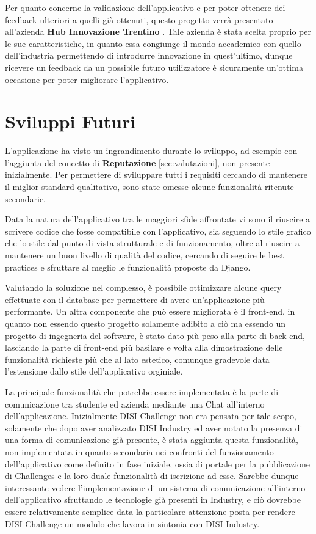 Per quanto concerne la validazione dell'applicativo e per poter ottenere dei feedback ulteriori a quelli già ottenuti, questo progetto verrà presentato all'azienda \textbf{Hub Innovazione Trentino} \cite{HiT}. Tale azienda è stata scelta proprio per le sue caratteristiche, in quanto essa congiunge il mondo accademico con quello dell'industria permettendo di introdurre innovazione in quest'ultimo, dunque ricevere un feedback da un possibile futuro utilizzatore è sicuramente un'ottima occasione per poter migliorare l'applicativo.


\section{Sviluppi Futuri}
L'applicazione ha visto un ingrandimento durante lo sviluppo, ad esempio con l'aggiunta del concetto di \textbf{Reputazione} \ref{sec:valutazioni}, non presente inizialmente. Per permettere di sviluppare tutti i requisiti cercando di mantenere il miglior standard qualitativo, sono state omesse alcune funzionalità ritenute secondarie.


Data la natura dell'applicativo tra le maggiori sfide affrontate vi sono il riuscire a scrivere codice che fosse compatibile con l'applicativo, sia seguendo lo stile grafico che lo stile dal punto di vista strutturale e di funzionamento, oltre al riuscire a mantenere un buon livello di qualità del codice, cercando di seguire le best practices e sfruttare al meglio le funzionalità proposte da Django.


Valutando la soluzione nel complesso, è possibile ottimizzare alcune query effettuate con il database per permettere di avere un'applicazione più performante. Un altra componente che può essere migliorata è il front-end, in quanto non essendo questo progetto solamente adibito a ciò ma essendo un progetto di ingegneria del software, è stato dato più peso alla parte di back-end, lasciando la parte di front-end più basilare e volta alla dimostrazione delle funzionalità richieste più che al lato estetico, comunque gradevole data l'estensione dallo stile dell'applicativo orginiale.


La principale funzionalità che potrebbe essere implementata è la parte di comunicazione tra studente ed azienda mediante una Chat all'interno dell'applicazione. Inizialmente DISI Challenge non era pensata per tale scopo, solamente che dopo aver analizzato DISI Industry ed aver notato la presenza di una forma di comunicazione già presente, è stata aggiunta questa funzionalità, non implementata in quanto secondaria nei confronti del funzionamento dell'applicativo come definito in fase iniziale, ossia di portale per la pubblicazione di Challenges e la loro duale funzionalità di iscrizione ad esse. Sarebbe dunque interessante vedere l'implementazione di un sistema di comunicazione all'interno dell'applicativo sfruttando le tecnologie già presenti in Industry, e ciò dovrebbe essere relativamente semplice data la particolare attenzione posta per rendere DISI Challenge un modulo che lavora in sintonia con DISI Industry.

